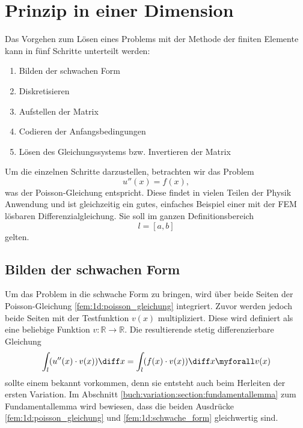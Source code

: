 %
%
%
%
\section{Prinzip in einer Dimension\label{fem:1d}}

Das Vorgehen zum Lösen eines Problems mit der Methode der finiten Elemente kann in fünf Schritte unterteilt werden:
\begin{enumerate}
    \item Bilden der schwachen Form
    \item Diskretisieren
    \item Aufstellen der Matrix
    \item Codieren der Anfangsbedingungen
    \item Lösen des Gleichungssystems bzw. Invertieren der Matrix
\end{enumerate}

Um die einzelnen Schritte darzustellen, betrachten wir das Problem
\begin{equation}
    u''(x) = f(x)
    \label{fem:1d:poisson_gleichung},
\end{equation}
was der Poisson-Gleichung entspricht. 
Diese findet in vielen Teilen der Physik Anwendung und ist gleichzeitig ein gutes, einfaches Beispiel einer mit der FEM lösbaren Differenzialgleichung.
Sie soll im ganzen Definitionsbereich
\begin{equation}
    l = [a,b]
\end{equation}
gelten.


\subsection{Bilden der schwachen Form}
Um das Problem in die schwache Form zu bringen, wird über beide Seiten der Poisson-Gleichung \eqref{fem:1d:poisson_gleichung} integriert.
Zuvor werden jedoch beide Seiten mit der Testfunktion $ v(x) $ multipliziert.
Diese wird definiert als eine beliebige Funktion $ v \colon \mathbb{R} \rightarrow \mathbb{R} $.
Die resultierende stetig differenzierbare Gleichung
\begin{equation}
    \int_l(u''(x) \cdot v(x)) \diff x = \int_l(f(x) \cdot v(x)) \diff x \myforall v(x)
    \label{fem:1d:schwache_form}
\end{equation}
sollte einem bekannt vorkommen, denn sie entsteht auch beim Herleiten der ersten Variation.
Im Abschnitt \ref{buch:variation:section:fundamentallemma} zum Fundamentallemma wird bewiesen, dass die beiden Ausdrücke \eqref{fem:1d:poisson_gleichung} und \eqref{fem:1d:schwache_form} gleichwertig sind.

